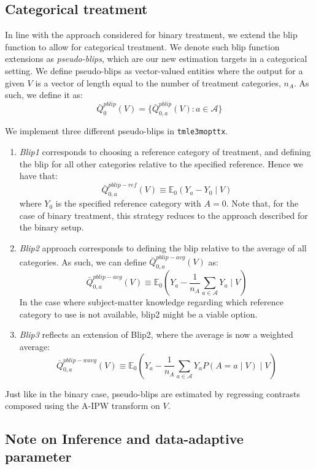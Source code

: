 \documentclass[12pt, krantz2,]{krantz}
\newcommand{\passthrough}[1]{#1}
\theoremstyle{definition}
\theoremstyle{definition}
\theoremstyle{definition}
\newcommand{\E}{\mathbb{E}}
\newcommand{\1}{\mathbbm{1}}
\begin{document}
\hypertarget{categorical-treatment}{%
\subsection{Categorical treatment}\label{categorical-treatment}}

In line with the approach considered for binary treatment, we extend the blip
function to allow for categorical treatment. We denote such blip function
extensions as \emph{pseudo-blips}, which are our new estimation targets in a
categorical setting. We define pseudo-blips as vector-valued entities where the
output for a given \(V\) is a vector of length equal to the number of treatment
categories, \(n_A\). As such, we define it as:
\[\bar{Q}_0^{pblip}(V) = \{\bar{Q}_{0,a}^{pblip}(V): a \in \mathcal{A} \}\]

We implement three different pseudo-blips in \passthrough{\lstinline!tmle3mopttx!}.

\begin{enumerate}
\def\labelenumi{\arabic{enumi}.}
\item
  \emph{Blip1} corresponds to choosing a reference category of treatment, and
  defining the blip for all other categories relative to the specified
  reference. Hence we have that:
  \[\bar{Q}_{0,a}^{pblip-ref}(V) \equiv \E_0(Y_a-Y_0 \mid V)\] where \(Y_0\) is
  the specified reference category with \(A=0\). Note that, for the case of
  binary treatment, this strategy reduces to the approach described for the
  binary setup.
\item
  \emph{Blip2} approach corresponds to defining the blip relative to the average of
  all categories. As such, we can define \(\bar{Q}_{0,a}^{pblip-avg}(V)\) as:
  \[\bar{Q}_{0,a}^{pblip-avg}(V) \equiv \E_0(Y_a - \frac{1}{n_A} \sum_{a \in
    \mathcal{A}} Y_a \mid V)\]
  In the case where subject-matter knowledge regarding which reference category
  to use is not available, blip2 might be a viable option.
\item
  \emph{Blip3} reflects an extension of Blip2, where the average is now a weighted
  average:
  \[\bar{Q}_{0,a}^{pblip-wavg}(V) \equiv \E_0(Y_a - \frac{1}{n_A} \sum_{a \in
    \mathcal{A}} Y_{a} P(A=a \mid V) \mid V)\]
\end{enumerate}

Just like in the binary case, pseudo-blips are estimated by regressing contrasts
composed using the A-IPW transform on \(V\).

\hypertarget{note-on-inference-and-data-adaptive-parameter}{%
\subsection{Note on Inference and data-adaptive parameter}\label{note-on-inference-and-data-adaptive-parameter}}
\end{document}
